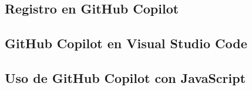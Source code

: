 \subsection{Registro en GitHub Copilot}
\subsection{GitHub Copilot en Visual Studio Code}

\subsection{Uso de GitHub Copilot con JavaScript}
